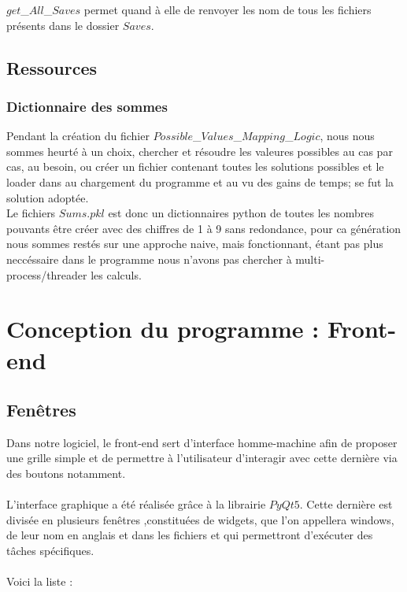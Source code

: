 \documentclass[french,12pt]{article}
\begin{document}
$get$\_$All$\_$Saves$ permet quand à elle de renvoyer les nom de tous les fichiers présents dans le dossier $Saves$.
\subsection{Ressources}
\subsubsection{Dictionnaire des sommes}

Pendant la création du fichier $Possible$\_$Values$\_$Mapping$\_$Logic$, nous nous sommes heurté à un choix, chercher et résoudre les valeures possibles au cas par cas, au besoin, ou créer un fichier contenant toutes les solutions possibles et le loader dans au chargement du programme et au vu des gains de temps; se fut la solution adoptée.\\

Le fichiers $Sums.pkl$ est donc un dictionnaires python de toutes les nombres pouvants être créer avec des chiffres de 1 à 9 sans redondance, pour ca génération nous sommes restés sur une approche naive, mais fonctionnant, étant pas plus neccéssaire dans le programme nous n'avons pas chercher à multi- process/threader les calculs.





\newpage
\section{Conception du programme : Front-end}
\subsection{Fenêtres}
Dans notre logiciel, le front-end sert d'interface homme-machine afin de proposer une grille simple et de permettre à l'utilisateur d'interagir avec cette dernière via des boutons notamment. \\ \\
L'interface graphique a été réalisée grâce à la librairie $PyQt5$. Cette dernière est divisée en plusieurs fenêtres ,constituées de widgets, que l'on appellera windows, de leur nom en anglais et dans les fichiers et qui permettront d'exécuter des tâches spécifiques. \\ \\
Voici la liste : \\
\end{document}
